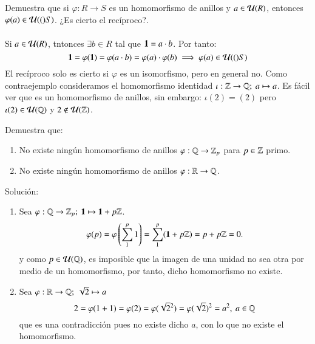 \begin{ex}[H1.14]
    Demuestra que si $\varphi: R \to S$ es un homomorfismo de anillos y $a \in \mathcal{U}(R)$, entonces $\varphi(a) \in \mathcal{U}(()S)$. ¿Es cierto el recíproco?.\\\\
    Si $a \in \mathcal{U}(R)$, tntonces $\exists b \in R$ tal que $\mathbf{1} = a\cdot b$. Por tanto:
    $$
        \mathbf{1} = \varphi(\mathbf{1}) = \varphi(a \cdot b) = \varphi(a) \cdot \varphi(b) \implies \varphi(a) \in \mathcal{U}(()S)
    $$
    El recíproco solo es cierto si $\varphi$ es un isomorfismo, pero en general no. Como contraejemplo consideramos el homomorfismo identidad $\iota : \Z \to \Q;\ a \mapsto a$. Es fácil ver que es un homomorfismo de anillos, sin embargo: $\iota(2) = (2)$ pero $\iota(2) \in \mathcal{U}(\mathbb{Q})$ y $2 \notin \mathcal{U}(\mathbb{Z})$.
\end{ex}

\begin{ex}[H1.16]
    Demuestra que:
    \begin{enumerate}
        \item No existe ningún homomorfismo de anillos $\varphi: \mathbb{Q} \to \mathbb{Z}_p$ para $p \in \mathbb{Z}$ primo.
        \item No existe ningún homomorfismo de anillos $\varphi: \mathbb{R} \to \mathbb{Q}$.
    \end{enumerate}
    Solución:
    \begin{enumerate}
        \item Sea $\varphi: \mathbb{Q} \to \mathbb{Z}_p;\ \mathbf{1} \mapsto \mathbf{1} + p\mathbb{Z}$.
        $$
            \varphi(p) = \varphi\left(\sum_1^p 1 \right) = \sum_1^p (\mathbf{1} + p\mathbb{Z}) = p + p\mathbb{Z} = 0.
        $$
        y como $p \in \mathcal{U}(\mathbb{Q})$, es imposible que la imagen de una unidad no sea otra por medio de un homomorfismo, por tanto, dicho homomorfismo no existe.
        \item Sea $\varphi: \mathbb{R} \to \mathbb{Q};\ \sqrt{2} \mapsto a$
        $$
            2 = \varphi(1 + 1) = \varphi(2) = \varphi(\sqrt{2}^2) = \varphi(\sqrt{2})^2 = a^2,\ a \in \mathbb{Q}
        $$
        que es una contradicción pues no existe dicho $a$, con lo que no existe el homomorfismo.
    \end{enumerate}
\end{ex}

